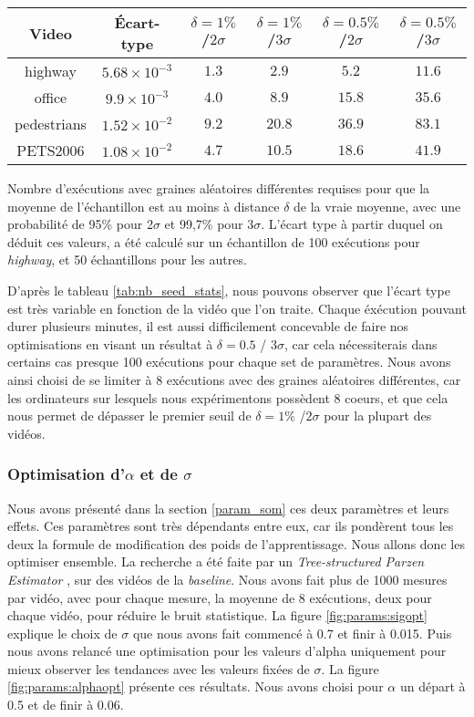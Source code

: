 	\begin{tableth}
	\label{tab:nb_seed_stats}
	\begin{tabular}{|c|c|cccc|}
		\hline
		Video	& Écart-type & $\delta=1\%$ /$2\sigma$ & $\delta=1\%$ /$3\sigma$ & $\delta=0.5\%$ /$2\sigma$ & $\delta=0.5\%$ /$3\sigma$\\
		\hline
		highway & $5.68 \times 10^{-3}$ & $1.3$ & $2.9$ & $5.2$ & $11.6$\\
		office & $9.9 \times 10^{-3}$ & $4.0$ & $8.9$ & $15.8$ & $35.6$\\
		pedestrians & $1.52 \times 10^{-2}$ & $9.2$ & $20.8$ & $36.9$ & $83.1$\\
		PETS2006 & $1.08 \times 10^{-2}$ & $4.7$ & $10.5$ & $18.6$ & $41.9$\\
		\hline
	\end{tabular}
	\caption[Estimations statistiques du nombre de graines requises]{Nombre d'exécutions avec graines aléatoires différentes requises pour que la moyenne de l'échantillon est au moins à distance $\delta$ de la vraie moyenne, avec une probabilité de 95\% pour 2$\sigma$ et 99,7\% pour 3$\sigma$. L'écart type à partir duquel on déduit ces valeurs, a été calculé sur un échantillon de 100 exécutions pour \textit{highway}, et 50 échantillons pour les autres.}
	\end{tableth}

	D'après le tableau \ref{tab:nb_seed_stats}, nous pouvons observer que l'écart type est très variable en fonction de la vidéo que l'on traite. Chaque éxécution pouvant durer plusieurs minutes, il est aussi difficilement concevable de faire nos optimisations en visant un résultat à $\delta = 0.5$ / $3\sigma$, car cela nécessiterais dans certains cas presque 100 exécutions pour chaque set de paramètres. Nous avons ainsi choisi de se limiter à 8 exécutions avec des graines aléatoires différentes, car les ordinateurs sur lesquels nous expérimentons possèdent 8 coeurs, et que cela nous permet de dépasser le premier seuil de $\delta=1\%$ /$2\sigma$ pour la plupart des vidéos.

	\subsubsection{Optimisation d'$\alpha$ et de $\sigma$}

	Nous avons présenté dans la section \ref{param_som} ces deux paramètres et leurs effets. Ces paramètres sont très dépendants entre eux, car ils pondèrent tous les deux la formule de modification des poids de l'apprentissage. Nous allons donc les optimiser ensemble. La recherche a été faite par un \textit{Tree-structured Parzen Estimator} \cite{bergstra2011algorithms}, sur des vidéos de la \textit{baseline}. Nous avons fait plus de 1000 mesures par vidéo, avec pour chaque mesure, la moyenne de 8 exécutions, deux pour chaque vidéo, pour réduire le bruit statistique. La figure \ref{fig:params:sigopt} explique le choix de $\sigma$ que nous avons fait commencé à 0.7 et finir à 0.015. Puis nous avons relancé une optimisation pour les valeurs d'alpha uniquement pour mieux observer les tendances avec les valeurs fixées de $\sigma$. La figure \ref{fig:params:alphaopt} présente ces résultats. Nous avons choisi pour $\alpha$ un départ à 0.5 et de finir à 0.06.

